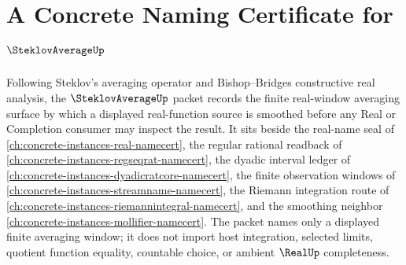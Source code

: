 \chapter{A Concrete Naming Certificate for $\SteklovAverageUp$}
\label{ch:concrete-instances-steklov-average-namecert}

Following Steklov's averaging operator and Bishop--Bridges constructive real analysis, the $\SteklovAverageUp$ packet records the finite real-window averaging surface by which a displayed real-function source is smoothed before any Real or Completion consumer may inspect the result. It sits beside the real-name seal of \autoref{ch:concrete-instances-real-namecert}, the regular rational readback of \autoref{ch:concrete-instances-regseqrat-namecert}, the dyadic interval ledger of \autoref{ch:concrete-instances-dyadicratcore-namecert}, the finite observation windows of \autoref{ch:concrete-instances-streamname-namecert}, the Riemann integration route of \autoref{ch:concrete-instances-riemannintegral-namecert}, and the smoothing neighbor \autoref{ch:concrete-instances-mollifier-namecert}. The packet names only a displayed finite averaging window; it does not import host integration, selected limits, quotient function equality, countable choice, or ambient $\RealUp$ completeness.


